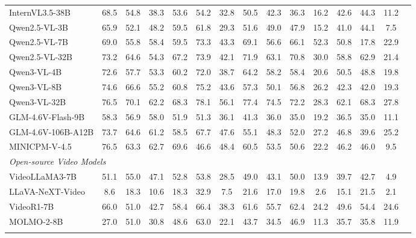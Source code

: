 \begin{table}[t]
{\begin{tabular}{l | cc | ccccc | cccccc | c}
InternVL3.5-38B & 68.5 & 54.8 & 38.3 & 53.6 & 54.2 & 32.8 & 50.5 & 42.3 & 36.3 & 16.2 & 42.6 & 44.3 & 11.2 & \cellcolor{gray!15}{42.0} \\
Qwen2.5-VL-3B & 65.9 & 52.1 & 48.2 & 59.5 & 61.8 & 29.3 & 51.6 & 49.0 & 47.9 & 15.2 & 41.0 & 44.1 & 7.5 & \cellcolor{gray!15}{44.1} \\
{Qwen2.5-VL-7B} & 69.0 & 55.8 & 58.4 & 59.5 & 73.3 & 43.3 & 69.1 & 56.6 & 66.1 & 52.3 & 50.8 & 17.8 & 22.9 & \cellcolor{gray!15}{53.5}\\
Qwen2.5-VL-32B & 73.2 & 64.6 & 54.3 & 67.2 & 73.9 & 42.1 & 71.9 & 63.1 & 70.8 & 30.0 & 58.8 & 62.9 & 21.4 & \cellcolor{gray!15}{58.0} \\
Qwen3-VL-4B & 72.6 & 57.7 & 53.3 & 60.2 & 72.0 & 38.7 & 64.2 & 58.2 & 58.4 & 20.6 & 50.5 & 48.8 & 19.8 & \cellcolor{gray!15}{51.9} \\
Qwen3-VL-8B & 74.6 & 66.6 & 55.2 & 60.8 & 75.2 & 43.6 & 57.3 & 50.1 & 56.8 & 26.2 & 42.3 & 42.0 & 19.3 & \cellcolor{gray!15}{51.5} \\
Qwen3-VL-32B & 76.5 & 70.1 & 62.2 & 68.3 & 78.1 & 56.1 & 77.4 & 74.5 & 72.2 & 28.3 & 62.1 & 68.3 & 27.8 & \cellcolor{gray!15}{63.2} \\
GLM-4.6V-Flash-9B & 58.3 & 56.9 & 58.0 & 51.9 & 51.3 & 36.1 & 41.3 & 36.0 & 35.0 & 19.2 & 36.5 & 35.0 & 11.1 & \cellcolor{gray!15}{40.5} \\
GLM-4.6V-106B-A12B & 73.7 & 64.6 & 61.2 & 58.5 & 67.7 & 47.6 & 55.1 & 48.3 & 52.0 & 27.2 & 46.8 & 39.6 & 25.2 & \cellcolor{gray!15}{51.4} \\
MINICPM-V-4.5 & 76.5 & 63.3 & 62.7 & 69.6 & 46.6 & 48.4 & 60.5 & 53.5 & 50.6 & 22.2 & 46.2 & 46.0 & 9.5 & \cellcolor{gray!15}{50.4} \\
\hline
\multicolumn{15}{l}{\emph{Open-source Video Models}} \\
VideoLLaMA3-7B & 51.1 & 55.0 & 47.1 & 52.8 & 53.8 & 28.5 & 49.0 & 43.1 & 50.0 & 13.9 & 39.7 & 42.7 & 4.9 & \cellcolor{gray!15}{40.9} \\
LLaVA-NeXT-Video & 8.6 & 18.3 & 10.6 & 18.3 & 32.9 & 7.5 & 21.6 & 17.0 & 19.8 & 2.6 & 15.1 & 21.5 & 2.1 & \cellcolor{gray!15}{15.1} \\
VideoR1-7B & 66.0 & 51.0 & 42.7 & 58.4 & 66.4 & 38.3 & 61.6 & 55.7 & 62.4 & 24.2 & 49.6 & 54.4 & 24.6 & \cellcolor{gray!15}{50.4} \\
MOLMO-2-8B & 27.0 & 51.0 & 30.8 & 48.6 & 63.0 & 22.1 & 43.7 & 34.5 & 46.9 & 11.3 & 35.7 & 35.8 & 11.9 & \cellcolor{gray!15}{35.6} \\
\hline
\Xhline{1pt}
\end{tabular}
}
\end{table}


